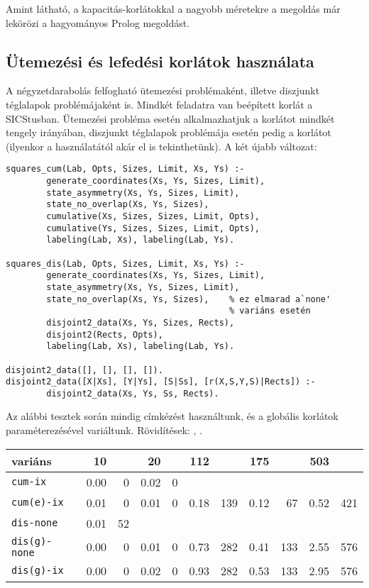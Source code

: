 Amint látható, a kapacitás-korlátokkal a nagyobb méretekre a \clpfd megoldás már
lekörözi a hagyományos Prolog megoldást.

\subsection{Ütemezési és lefedési korlátok használata}

A négyzetdarabolás felfogható ütemezési problémaként, illetve diszjunkt téglalapok
problémájaként is. Mindkét feladatra van beépített korlát a SICStusban. Ütemezési
probléma esetén alkalmazhatjuk a  korlátot mindkét tengely irányában,
diszjunkt téglalapok problémája esetén pedig a  korlátot (ilyenkor a
 használatától akár el is tekinthetünk).
\br
A két újabb változat:

\begin{verbatim}
squares_cum(Lab, Opts, Sizes, Limit, Xs, Ys) :-
        generate_coordinates(Xs, Ys, Sizes, Limit),
        state_asymmetry(Xs, Ys, Sizes, Limit),
        state_no_overlap(Xs, Ys, Sizes),   
        cumulative(Xs, Sizes, Sizes, Limit, Opts),
        cumulative(Ys, Sizes, Sizes, Limit, Opts),
        labeling(Lab, Xs), labeling(Lab, Ys).

squares_dis(Lab, Opts, Sizes, Limit, Xs, Ys) :-
        generate_coordinates(Xs, Ys, Sizes, Limit),
        state_asymmetry(Xs, Ys, Sizes, Limit),
        state_no_overlap(Xs, Ys, Sizes),    % ez elmarad a`none' 
                                            % variáns esetén
        disjoint2_data(Xs, Ys, Sizes, Rects),
        disjoint2(Rects, Opts),
        labeling(Lab, Xs), labeling(Lab, Ys).

disjoint2_data([], [], [], []).
disjoint2_data([X|Xs], [Y|Ys], [S|Ss], [r(X,S,Y,S)|Rects]) :-
        disjoint2_data(Xs, Ys, Ss, Rects).
\end{verbatim}

Az alábbi tesztek során mindig \cd{[min]} címkézést használtunk, és a globális
korlátok paraméterezésével variáltunk. Rövidítések: ,
.

\begin{center}
\begin{tabular}{|l|rr|rr|rr|rr|rr|}
\hline
variáns   & 10     &      &  20   &      & 112    &      & 175   &    & 503  &\\
\hline
{\tt cum-ix}      &  0.00&    0&  0.02&    0&       &     &       &     &       &     \\
{\tt cum(e)-ix}   &  0.01&    0&  0.01&    0&  0.18&  139&  0.12&   67&  0.52&  421\\
\hline
{\tt dis-none}    &  0.01&   52&       &     &       &     &       &     &       &     \\
{\tt dis(g)-none} &  0.00&    0&  0.01&    0&  0.73&  282&  0.41&  133&  2.55&  576\\
{\tt dis(g)-ix}   &  0.00&    0&  0.02&    0&  0.93&  282&  0.53&  133&  2.95&  576\\
\hline
\end{tabular}
\end{center}

